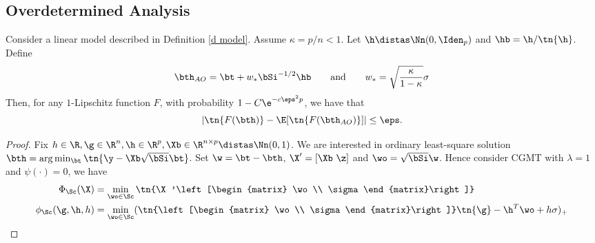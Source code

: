 \subsection{Overdetermined Analysis}
\begin{theorem} Consider a linear model described in Definition \ref{d model}. Assume $\kappa=p/n<1$. Let $\h\distas\Nn(0,\Iden_p)$ and $\hb=\h/\tn{\h}$. Define
\[
\bth_{AO}=\bt+w_*\bSi^{-1/2}\hb\qquad\text{and}\qquad w_*=\sqrt{\frac{\kappa}{1-\kappa}}\sigma
\]
Then, for any $1$-Lipschitz function $F$, with probability $1-C\e^{-c\eps^2p}$, we have that
\[
|\tn{F(\bth)}-\E[\tn{F(\bth_{AO})}]|\leq \eps.%
\]
\end{theorem}
\begin{proof}
Fix $h\in\R,\g\in\R^n,\h\in\R^p,\Xb\in\R^{n\times p}\distas\Nn(0,1)$. We are interested in ordinary least-square solution $\bth=\arg\min_{\bt}{\tn{\y-\Xb\sqrt{\bSi}\bt}}$. Set $\w=\bt-\bth$, $\X'=[\Xb~\z]$ and $\wo=\sqrt{\bSi}\w$. Hence consider CGMT with $\lambda=1$ and $\psi(\cdot)=0$, we have
\begin{align}
\Phi_\Sc(\X)&=\min_{\wo\in\Sc}\tn{\X'\left[\begin{matrix}
    \wo  \\
    \sigma 
\end{matrix}\right]}\label{overder Phi}\\
\phi_\Sc(\g,\h, h)&=\min_{\wo\in\Sc}(\tn{\left[\begin{matrix}
    \wo  \\
    \sigma 
\end{matrix}\right]}\tn{\g}-\h^T\wo+h\sigma)_+\label{overder phi}
\end{align}

\end{proof}
